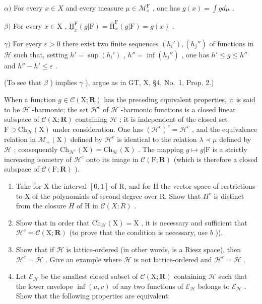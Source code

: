 \(\alpha)\) For every \(x \in X\) and every measure \(\mu \in \mathcal{M}_x^{\mathrm{F}}\) , one has \(g(x) = \int g d\mu\) .

\(\beta)\) For every \(x \in \mathrm{X}\) , \(\underline{\mathrm{H}}_x^{\mathrm{F}}(g|\mathrm{F}) = \overline{\mathrm{H}}_x^{\mathrm{F}}(g|\mathrm{F}) = g(x)\) .

\(\gamma)\) For every \(\varepsilon > 0\) there exist two finite sequences \((h_i'), (h_j'')\) of functions in \(\mathcal{H}\) such that, setting \(h' = \sup(h_i')\) , \(h'' = \inf(h_j'')\) , one has \(h' \leqslant g \leqslant h''\) and \(h'' - h' \leqslant \varepsilon\) .

(To see that \(\beta\) ) implies \(\gamma\) ), argue as in GT, X, §4, No.~1, Prop. 2.)

When a function \(g \in \mathcal{C}(\mathrm{X};\mathbf{R})\) has the preceding equivalent properties, it is said to be \(\mathcal{H}\) -harmonic; the set \(\mathcal{H}^c\) of \(\mathcal{H}\) -harmonic functions is a closed linear subspace of \(\mathcal{C}(\mathrm{X};\mathbf{R})\) containing \(\mathcal{H}\) ; it is independent of the closed set \(\mathrm{F} \supset \mathrm{Ch}_{\mathcal{H}}(\mathrm{X})\) under consideration. One has \((\mathcal{H}^c)^c = \mathcal{H}^c\) , and the equivalence relation in \(\mathcal{M}_+(\mathrm{X})\) defined by \(\mathcal{H}^c\) is identical to the relation \(\lambda \prec \mu\) defined by \(\mathcal{H}\) ; consequently \(\mathrm{Ch}_{\mathcal{H}^c}(\mathrm{X}) = \mathrm{Ch}_{\mathcal{H}}(\mathrm{X})\) . The mapping \(g \mapsto g|\mathrm{F}\) is a strictly increasing isometry of \(\mathcal{H}^c\) onto its image in \(\mathcal{C}(\mathrm{F};\mathbf{R})\) (which is therefore a closed subspace of \(\mathcal{C}(\mathrm{F};\mathbf{R})\) ).

\begin{enumerate}
\def\labelenumi{\alph{enumi})}
\setcounter{enumi}{3}
\item
  Take for X the interval \([0,1]\) of R, and for H the vector space of restrictions to X of the polynomials of second degree over R. Show that \(H^{c}\) is distinct from the closure \(\overline{H}\) of H in \(\mathcal{C}(X;R)\) .
\item
  Show that in order that \(\mathrm{Ch}_{\mathcal{H}}(\mathrm{X}) = \mathrm{X}\) , it is necessary and sufficient that \(\mathcal{H}^c = \mathcal{C}(\mathrm{X};\mathbf{R})\) (to prove that the condition is necessary, use \(b\) )).
\item
  Show that if \(\mathcal{H}\) is lattice-ordered (in other words, is a Riesz space), then \(\mathcal{H}^c = \overline{\mathcal{H}}\) . Give an example where \(\mathcal{H}\) is not lattice-ordered and \(\mathcal{H}^c = \overline{\mathcal{H}}\) .
\item
  Let \(\mathcal{E}_{\mathcal{H}}\) be the smallest closed subset of \(\mathcal{C}(\mathrm{X};\mathbf{R})\) containing \(\mathcal{H}\) such that the lower envelope \(\inf (u,v)\) of any two functions of \(\mathcal{E}_{\mathcal{H}}\) belongs to \(\mathcal{E}_{\mathcal{H}}\) . Show that the following properties are equivalent:
\end{enumerate}

